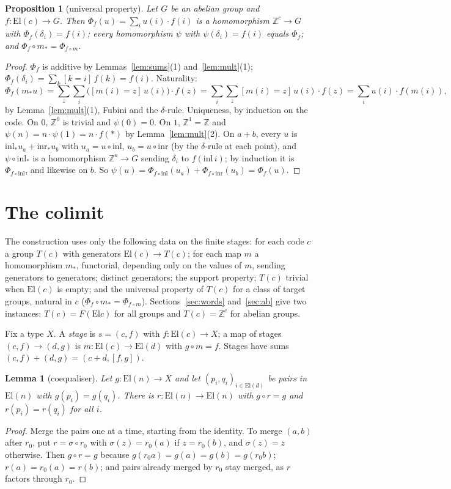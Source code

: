 \documentclass[11pt]{amsart}
\newtheorem{proposition}[theorem]{Proposition}
\newtheorem{lemma}[theorem]{Lemma}
\theoremstyle{definition}
\theoremstyle{remark}
\newcommand{\El}{\mathrm{El}}
\newcommand{\Z}{\mathbb{Z}}
\begin{document}
\begin{proposition}[universal property]\label{prop:ab-up}
Let $G$ be an abelian group and $f:\El(c)\to G$. Then
$\Phi_f(u)=\sum_i u(i)\cdot f(i)$ is a homomorphism $\Z^c\to G$ with
$\Phi_f(\delta_i)=f(i)$; every homomorphism $\psi$ with
$\psi(\delta_i)=f(i)$ equals $\Phi_f$; and $\Phi_f\circ m_*=\Phi_{f\circ m}$.
\end{proposition}
\begin{proof}
$\Phi_f$ is additive by Lemmas~\ref{lem:sums}(1) and~\ref{lem:mult}(1);
$\Phi_f(\delta_i)=\sum_k [k=i]\,f(k)=f(i)$. Naturality:
\[
\Phi_f(m_*u)=\sum_z\sum_i \big([m(i)=z]\,u(i)\big)\cdot f(z)
=\sum_i\sum_z [m(i)=z]\,u(i)\cdot f(z)=\sum_i u(i)\cdot f(m(i)),
\]
by Lemma~\ref{lem:mult}(1), Fubini and the $\delta$-rule. Uniqueness, by
induction on the code. On $0$, $\Z^0$ is trivial and $\psi(0)=0$. On $1$,
$\Z^1=\Z$ and $\psi(n)=n\cdot\psi(1)=n\cdot f(*)$ by
Lemma~\ref{lem:mult}(2). On $a+b$, every $u$ is
$\mathrm{inl}_*u_a+\mathrm{inr}_*u_b$ with $u_a=u\circ\mathrm{inl}$,
$u_b=u\circ\mathrm{inr}$ (by the $\delta$-rule at each point), and
$\psi\circ\mathrm{inl}_*$ is a homomorphism $\Z^a\to G$ sending $\delta_i$
to $f(\mathrm{inl}\,i)$; by induction it is $\Phi_{f\circ\mathrm{inl}}$,
and likewise on $b$. So $\psi(u)=\Phi_{f\circ\mathrm{inl}}(u_a)+
\Phi_{f\circ\mathrm{inr}}(u_b)=\Phi_f(u)$.
\end{proof}

\section{The colimit}\label{sec:colimit}

The construction uses only the following data on the finite stages: for
each code $c$ a group $T(c)$ with generators $\El(c)\to T(c)$; for each
map $m$ a homomorphism $m_*$, functorial, depending only on the values of
$m$, sending generators to generators; distinct generators; the support
property; $T(c)$ trivial when $\El(c)$ is empty; and the universal
property of $T(c)$ for a class of target groups, natural in $c$
($\Phi_f\circ m_*=\Phi_{f\circ m}$). Sections~\ref{sec:words}
and~\ref{sec:ab} give two instances: $T(c)=F(\El c)$ for all groups and
$T(c)=\Z^c$ for abelian groups.

Fix a type $X$. A \emph{stage} is $s=(c,f)$ with $f:\El(c)\to X$; a map
of stages $(c,f)\to(d,g)$ is $m:\El(c)\to\El(d)$ with $g\circ m=f$.
Stages have sums $(c,f)+(d,g)=(c+d,[f,g])$.

\begin{lemma}[coequaliser]\label{lem:coeq}
Let $g:\El(n)\to X$ and let $(p_i,q_i)_{i\in\El(d)}$ be pairs in
$\El(n)$ with $g(p_i)=g(q_i)$. There is $r:\El(n)\to\El(n)$ with
$g\circ r=g$ and $r(p_i)=r(q_i)$ for all $i$.
\end{lemma}
\begin{proof}
Merge the pairs one at a time, starting from the identity. To merge
$(a,b)$ after $r_0$, put $r=\sigma\circ r_0$ with
$\sigma(z)=r_0(a)$ if $z=r_0(b)$, and $\sigma(z)=z$ otherwise. Then
$g\circ r=g$ because $g(r_0a)=g(a)=g(b)=g(r_0b)$; $r(a)=r_0(a)=r(b)$;
and pairs already merged by $r_0$ stay merged, as $r$ factors through
$r_0$.
\end{proof}
\end{document}
